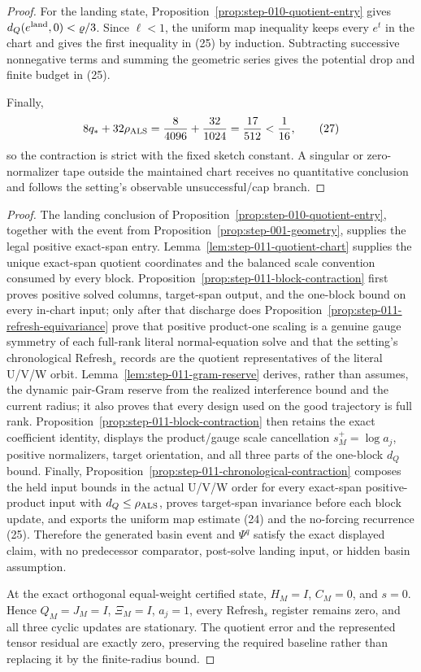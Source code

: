 \begin{proposition}
\begin{proof}
For the landing state, Proposition~\ref{prop:step-010-quotient-entry} gives
\(d_Q(e^{\rm land},0)<\varrho/3\). Since \(\ell<1\), the uniform map
inequality keeps every \(e^t\) in the chart and gives the first inequality
in (25) by induction. Subtracting successive nonnegative terms and summing
the geometric series gives the potential drop and finite budget in (25).

Finally,
\[
 8q_*+32\rho_{\rm ALS}
 ={8\over4096}+{32\over1024}
 ={17\over512}< {1\over16},
\tag{27}
\]
so the contraction is strict with the fixed sketch constant. A singular or
zero-normalizer tape outside the maintained chart receives no quantitative
conclusion and follows the setting's observable unsuccessful/cap branch.

\end{proof}
\end{proposition}
\begin{proof}
The landing conclusion of Proposition~\ref{prop:step-010-quotient-entry},
together with the event from Proposition~\ref{prop:step-001-geometry},
supplies the legal positive exact-span entry.
Lemma~\ref{lem:step-011-quotient-chart} supplies the unique exact-span
quotient coordinates and the balanced scale convention consumed by every
block. Proposition~\ref{prop:step-011-block-contraction} first proves
positive solved columns, target-span output, and the one-block bound on every
in-chart input; only after that discharge does
Proposition~\ref{prop:step-011-refresh-equivariance} prove that
positive product-one scaling is a genuine gauge symmetry of each full-rank
literal normal-equation solve and that the setting's chronological
Refresh$_s$ records are the quotient representatives of the literal U/V/W
orbit. Lemma~\ref{lem:step-011-gram-reserve} derives, rather than assumes,
the dynamic pair-Gram reserve from the realized interference bound
and the current radius; it also proves that every design used on the good
trajectory is full rank. Proposition~\ref{prop:step-011-block-contraction}
then retains the exact coefficient identity, displays the product/gauge
scale cancellation
\(s_M^+=\log a_j\), positive normalizers, target orientation, and all three
parts of the one-block \(d_Q\) bound. Finally,
Proposition~\ref{prop:step-011-chronological-contraction} composes the held
input bounds in the actual U/V/W order for every exact-span positive-product
input with \(d_Q\le\rho_{\rm ALS}\), proves target-span invariance before
each block update, and exports the uniform map estimate (24) and the
no-forcing recurrence (25). Therefore the generated basin event and
\(\Psi^q\) satisfy the exact displayed claim, with no predecessor
comparator, post-solve landing input, or hidden basin assumption.

At the exact orthogonal equal-weight certified state,
\(H_M=I\), \(C_M=0\), and \(s=0\). Hence \(Q_M=J_M=I\),
\(\Xi_M=I\), \(a_j=1\), every Refresh$_s$ register remains zero, and all
three cyclic updates are stationary. The quotient error and the represented
tensor residual are exactly zero, preserving the required baseline rather
than replacing it by the finite-radius bound.
\end{proof}

